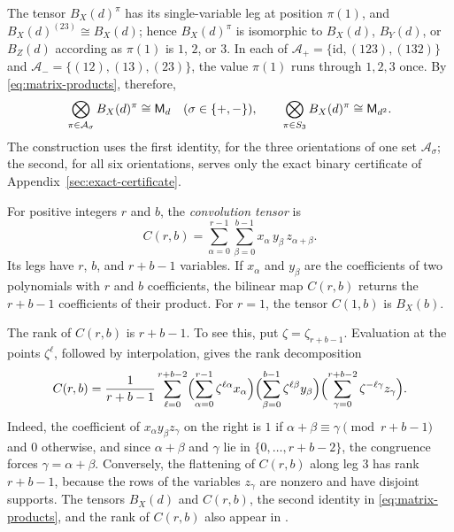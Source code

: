 The tensor \(B_X(d)^\pi\) has its single-variable leg at position
\(\pi(1)\), and \(B_X(d)^{(23)}\cong B_X(d)\); hence \(B_X(d)^\pi\) is
isomorphic to \(B_X(d)\), \(B_Y(d)\), or \(B_Z(d)\) according as
\(\pi(1)\) is \(1\), \(2\), or \(3\). In each of
\(\mathcal A_+=\{\mathrm{id},(123),(132)\}\) and
\(\mathcal A_-=\{(12),(13),(23)\}\), the value \(\pi(1)\) runs through
\(1,2,3\) once. By \eqref{eq:matrix-products}, therefore,
\begin{equation}\label{eq:coset-dot-products}
 \bigotimes_{\pi\in\mathcal A_\sigma}B_X(d)^\pi\cong\mathsf M_d
 \quad(\sigma\in\{+,-\}),\qquad
 \bigotimes_{\pi\in S_3}B_X(d)^\pi\cong\mathsf M_{d^2}.
\end{equation}
The construction uses the first identity, for the three orientations of one
set \(\mathcal A_\sigma\); the second, for all six orientations, serves only
the exact binary certificate of Appendix~\ref{sec:exact-certificate}.

For positive integers \(r\) and \(b\), the \emph{convolution tensor} is
\begin{equation}\label{eq:convolution}
 C(r,b)=\sum_{\alpha=0}^{r-1}\sum_{\beta=0}^{b-1}
        x_\alpha\, y_\beta\, z_{\alpha+\beta}.
\end{equation}
Its legs have \(r\), \(b\), and \(r+b-1\) variables. If \(x_\alpha\) and
\(y_\beta\) are the coefficients of two polynomials with \(r\) and \(b\)
coefficients, the bilinear map \(C(r,b)\) returns the \(r+b-1\) coefficients
of their product. For \(r=1\), the tensor \(C(1,b)\) is \(B_X(b)\).

The rank of \(C(r,b)\) is \(r+b-1\). To see this, put
\(\zeta=\zeta_{r+b-1}\). Evaluation at the points \(\zeta^\ell\),
followed by interpolation, gives the rank decomposition
\begin{equation}\label{eq:convolution-rank}
 C(r,b)=\frac1{r+b-1}\sum_{\ell=0}^{r+b-2}
 \Bigl(\sum_{\alpha=0}^{r-1}\zeta^{\ell\alpha}x_\alpha\Bigr)
 \Bigl(\sum_{\beta=0}^{b-1}\zeta^{\ell\beta}y_\beta\Bigr)
 \Bigl(\sum_{\gamma=0}^{r+b-2}\zeta^{-\ell\gamma}z_\gamma\Bigr).
\end{equation}
Indeed, the coefficient of \(x_\alpha y_\beta z_\gamma\) on the right is
\(1\) if \(\alpha+\beta\equiv\gamma\pmod{r+b-1}\) and \(0\) otherwise,
and since \(\alpha+\beta\) and \(\gamma\) lie in \(\{0,\ldots,r+b-2\}\),
the congruence forces \(\gamma=\alpha+\beta\). Conversely, the flattening
of \(C(r,b)\) along leg \(3\) has rank \(r+b-1\), because the rows of the
variables \(z_\gamma\) are nonzero and have disjoint supports. The tensors
\(B_X(d)\) and \(C(r,b)\), the second identity in
\eqref{eq:matrix-products}, and the rank of \(C(r,b)\) also appear
in \citet[Sections~2 and~4]{OAI26}.

